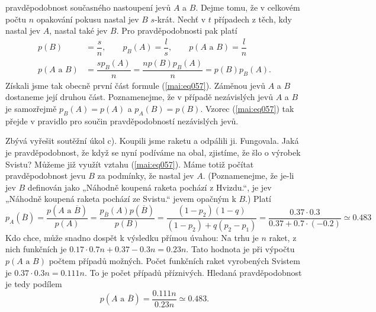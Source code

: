 \begin{example}
    pravděpodobnost současného nastoupení jevů \(A\) a \(B\). Dejme tomu, že v celkovém počtu \(n\) 
    opakování pokusu nastal jev \(B\) \(s\)-krát. Nechť v \(t\) případech z těch, kdy nastal jev 
    \(A\), nastal také jev \(B\). Pro pravděpodobnosti pak platí
    \begin{align*}
      p(B) &= \dfrac{s}{n}, \qquad p_B(A) = \dfrac{l}{s}, \qquad p(A\text{ a }B) = \dfrac{l}{n}  \\
      p(A\text{ a }B) &= \dfrac{sp_B(A)}{n} = \dfrac{np(B)p_B(A)}{n} = p(B)p_B(A).
    \end{align*}
    Získali jsme tak obecně první část formule (\ref{mai:eq057}). Záměnou jevů \(A\) a \(B\) 
    dostaneme její druhou část. Poznamenejme, že v případě nezávislých jevů \(A\) a \(B\) je 
    samozřejmě \(p_B(A) = p(A)\) a \(p_A(B) = p(B)\). Vzorec (\ref{mai:eq057}) tak přejde v 
    pravidlo pro součin pravděpodobností nezávislých jevů.
    
    Zbývá vyřešit soutěžní úkol c). Koupili jsme raketu a odpálili ji. Fungovala. Jaká je 
    pravděpodobnost, že když se nyní podíváme na obal, zjistíme, že šlo o výrobek Svistu? Můžeme 
    již využít vztahu (\ref{mai:eq057}). Máme totiž počítat pravděpodobnost jevu \(B\) za podmínky, 
    že nastal jev \(A\). (Poznamenejme, že je-li jev \(B\) definován jako „Náhodně koupená raketa 
    pochází z Hvizdu.“, je jev „Náhodně koupená raketa pochází ze Svistu.“ jevem opačným k \(B\).) 
    Platí
    \begin{equation*}
      p_A(\overline{B}) = \dfrac{p(A\text{ a }\overline{B})}{p(A)}
                        = \dfrac{p_{\overline{B}}(A)p(\overline{B})}{p(B)}
                        = \dfrac{(1 - p_2)(1 - q)}{(1 - p_2) + q(p_2 - p_1)}
                        = \dfrac{\num{0.37}\cdot\num{0.3}}{\num{0.37} + \num{0.7}\cdot(\num{-0.2})}
                        \simeq\num{0.483}
    \end{equation*}
    Kdo chce, může snadno dospět k výsledku přímou úvahou: Na trhu je \(n\) raket, z nich funkčních 
    je \(\num{0.17}\cdot\num{0.7}n + \num{0.37} - \num{0.3}n = \num{0.23}n\). Tato hodnota je při 
    výpočtu \(p(A\text{ a }B)\)  počtem případů možných. Počet funkčních raket vyrobených Svistem 
    je \(\num{0.37}\cdot\num{0.3}n = \num{0.111}n\). To je počet případů příznivých. Hledaná 
    pravděpodobnost je tedy podílem
    \begin{equation*}
      p(A\text{ a }\overline{B}) = \dfrac{\num{0.111}n}{\num{0.23}n}\simeq\num{0.483}.
    \end{equation*}
\normalsize
\end{example}